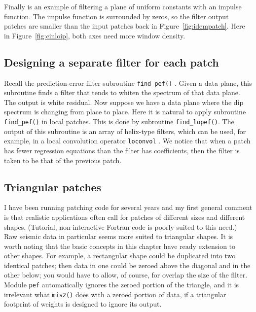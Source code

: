 \par
Finally is an example
of filtering a plane of uniform constants with an impulse function.
The impulse function is surrounded by zeros,
so the filter output patches are smaller than 
the input patches back in Figure~\ref{fig:idempatch}.
Here in Figure~\ref{fig:cinloip},
both axes need more window density.


\subsection{Designing a separate filter for each patch}
Recall the prediction-error filter subroutine 
\texttt{find\_pef()} .
Given a data plane, this subroutine finds a filter that tends
to whiten the spectrum of that data plane.
The output is white residual.
Now suppose we have a data plane where the dip spectrum
is changing from place to place.
Here it is natural to apply subroutine {\tt find\_pef()} in local patches.
This is done by subroutine \texttt{find\_lopef()}. 
The output of this subroutine is an array of helix-type filters,
which can be used, for example,
in a local convolution operator
\texttt{loconvol} .
We notice that when a patch has fewer regression equations
than the filter has coefficients, then the filter is taken
to be that of the previous patch.


\par

\subsection{Triangular patches}
I have been running patching code for several years
and my first general comment is that realistic applications
often call for patches of different sizes and different shapes.
(Tutorial, non-interactive Fortran code is poorly suited to this need.)
Raw seismic data in particular seems more suited to triangular shapes.
It is worth noting that the basic concepts in this chapter
have ready extension to other shapes.
For example,
a rectangular shape could be duplicated into two identical patches;
then data in one could be zeroed above the diagonal
and in the other below;
you would have to allow, of course, for overlap the size of the filter.
Module \texttt{pef}  automatically ignores the zeroed portion
of the triangle,
and it is irrelevant what \texttt{mis2()} 
does with a zeroed portion of data,
if a triangular footprint of weights is designed to ignore its output.


